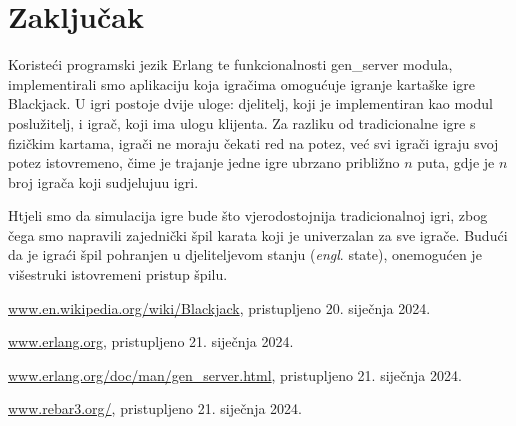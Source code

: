 \documentclass{IEEEcsmag}
\begin{document}
\section{Zaključak}
\vspace{5mm}
Koristeći programski jezik Erlang te funkcionalnosti gen\_server modula, implementirali smo aplikaciju koja igračima omogućuje igranje kartaške igre Blackjack. U igri postoje dvije uloge: djelitelj, koji je implementiran kao modul poslužitelj, i igrač, koji ima ulogu klijenta.  Za razliku od tradicionalne igre s fizičkim kartama, igrači ne moraju čekati red na potez, već svi igrači igraju svoj potez istovremeno, čime je trajanje jedne igre ubrzano približno $n$ puta, gdje je $n$ broj igrača koji sudjeluju\break u igri.

Htjeli smo da simulacija igre bude što vjerodostojnija tradicionalnoj igri, zbog čega smo napravili zajednički špil karata koji je univerzalan za sve igrače. Budući da je igraći špil pohranjen u djeliteljevom stanju (\textit{engl}. state), onemogućen je višestruki istovremeni pristup špilu. 


\def\refname{Literatura}

\begin{thebibliography}{1}

\url{www.en.wikipedia.org/wiki/Blackjack}, pristupljeno 20. siječnja 2024.

\url{www.erlang.org}, pristupljeno 21. siječnja 2024.

\url{www.erlang.org/doc/man/gen_server.html}, pristupljeno 21. siječnja 2024.

\url{www.rebar3.org/}, pristupljeno 21. siječnja 2024.

\end{thebibliography}\vspace*{-8pt}
\end{document}
